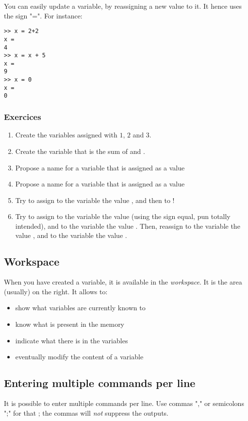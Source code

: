 You can easily update a variable, by reassigning a new value to it. It hence uses the sign "=".
For instance:
\begin{lstlisting}
>> x = 2+2
x = 
4
>> x = x + 5
x =
9
>> x = 0
x =
0
\end{lstlisting}


\subsubsection{Exercices}
\begin{enumerate}
	\item Create the variables  assigned with $1$, $2$ and $3$.
	\item Create the variable  that is the sum of  and .
	\item Propose a name for a variable that is assigned as a value 
	\item Propose a name for a variable that is assigned as a value 
	\item Try to assign to the variable  the value , and then to !
	\item Try to assign to the variable  the value  (using the sign equal, pun totally intended), and to the variable  the value .
Then, reassign to the variable  the value , and to the variable  the value .

\end{enumerate}


\subsection{Workspace}
When you have created a variable, it is available in the \emph{workspace}.
It is the area (usually) on the right.
It allows to:
\begin{itemize}
	\item show what variables are currently known to \matlab
	\item know what is present in the memory
	\item indicate what there is in the variables
	\item eventually modify the content of a variable
\end{itemize}

\subsection{Entering multiple commands per line}
It is possible to enter multiple commands per line. 
Use commas "," or semicolons ";" for that ; the commas will \emph{not} suppress the outputs.

